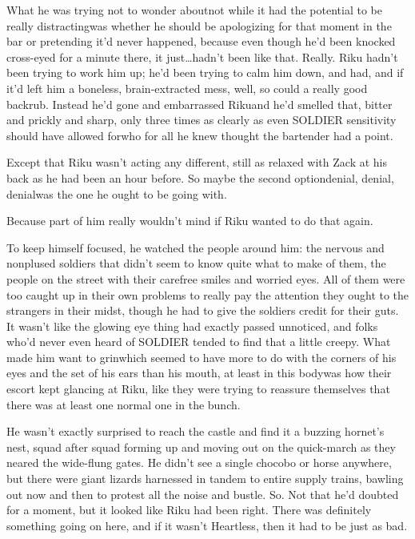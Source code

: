 What he was trying not to wonder about\textemdash not while it had the potential to be really distracting\textemdash was whether he should be apologizing for that moment in the bar or pretending it'd never happened, because even though he'd been knocked cross-eyed for a minute there, it just…hadn't been like that. Really. Riku hadn't been trying to work him up; he'd been trying to calm him down, and had, and if it'd left him a boneless, brain-extracted mess, well, so could a really good backrub. Instead he'd gone and embarrassed Riku\textemdash and he'd smelled that, bitter and prickly and sharp, only three times as clearly as even SOLDIER sensitivity should have allowed for\textemdash who for all he knew thought the bartender had a point.

Except that Riku wasn't acting any different, still as relaxed with Zack at his back as he had been an hour before. So maybe the second option\textemdash denial, denial, denial\textemdash was the one he ought to be going with.

Because part of him really wouldn't mind if Riku wanted to do that again.

To keep himself focused, he watched the people around him: the nervous and nonplused soldiers that didn't seem to know quite what to make of them, the people on the street with their carefree smiles and worried eyes. All of them were too caught up in their own problems to really pay the attention they ought to the strangers in their midst, though he had to give the soldiers credit for their guts. It wasn't like the glowing eye thing had exactly passed unnoticed, and folks who'd never even heard of SOLDIER tended to find that a little creepy. What made him want to grin\textemdash which seemed to have more to do with the corners of his eyes and the set of his ears than his mouth, at least in this body\textemdash was how their escort kept glancing at Riku, like they were trying to reassure themselves that there was at least one normal one in the bunch.

He wasn't exactly surprised to reach the castle and find it a buzzing hornet's nest, squad after squad forming up and moving out on the quick-march as they neared the wide-flung gates. He didn't see a single chocobo or horse anywhere, but there were giant lizards harnessed in tandem to entire supply trains, bawling out now and then to protest all the noise and bustle. So. Not that he'd doubted for a moment, but it looked like Riku had been right. There was definitely something going on here, and if it wasn't Heartless, then it had to be just as bad.

